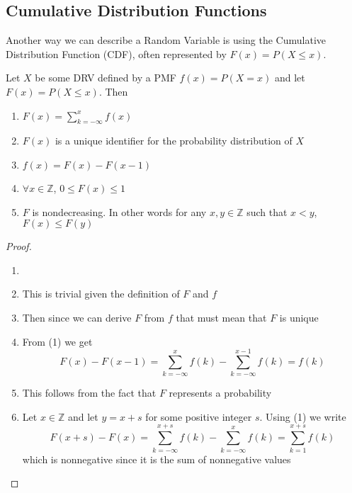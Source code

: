 \documentclass{report}
\begin{document}
\subsection{Cumulative Distribution Functions}
Another way we can describe a Random Variable is using the Cumulative Distribution Function (CDF), often represented by $F(x)=P(X\le x)$. 
\begin{theorem}
    Let $X$ be some DRV defined by a PMF $f(x)=P(X=x)$ and let $F(x)=P(X\le x)$. Then
    \begin{enumerate}
        \item $F(x)=\displaystyle\sum_{k=-\infty}^x f(x)$
        \item $F(x)$ is a unique identifier for the probability distribution of $X$
        \item $f(x)=F(x)-F(x-1)$
        \item $\forall x\in\mathbb Z$, $0\le F(x) \le 1$
        \item $F$ is nondecreasing. In other words for any $x,y\in\mathbb Z$ such that $x<y$, $F(x)\le F(y)$
    \end{enumerate}
    \begin{proof}
        \begin{enumerate}
            \item[]
            \item This is trivial given the definition of $F$ and $f$
            \item Then since we can derive $F$ from $f$ that must mean that $F$ is unique
            \item From (1) we get
            \[
                F(x)-F(x-1)=\sum_{k=-\infty}^x f(k) - \sum_{k=-\infty}^{x-1} f(k) =f(k)
            \]
            \item This follows from the fact that $F$ represents a probability 
            \item Let $x\in\mathbb Z$ and let $y=x+s$ for some positive integer $s$. Using (1) we write
            \[
                F(x+s)-F(x)=\sum_{k=-\infty}^{x+s} f(k) - \sum_{k=-\infty}^{x} f(k) = \sum_{k=1}^{x+s} f(k) 
            \]
            which is nonnegative since it is the sum of nonnegative values
        \end{enumerate}
        
    \end{proof}
\end{theorem}
\end{document}

